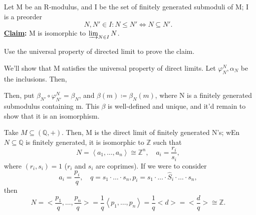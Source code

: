 \documentclass[../category_theory.tex]{subfiles}
\begin{document}
\begin{example}
	Let M be an R-modulus, and I be the set of finitely generated submoduli of M; I is a preorder
	\[
		N, N'\in I: N\leq N'\Longleftrightarrow N\subseteq N'.
	\]
	\textbf{\underline{Claim}:} M is isomorphic to \(\varinjlim_{N\in I}N\).
	\begin{exr}
		Use the universal property of directed limit to prove the claim.
	\end{exr}
	We'll show that M satisfies the universal property of direct limits. Let \(\varphi_{N}^{N}, \alpha_{N}\) be the inclusions. Then,
	\begin{center}
	\end{center}
	Then, put \(\beta_{N'}\circ \varphi_{N'}^{N}=\beta_{N}\), and \(\beta(m)\coloneqq \beta_{N}(m)\), where N is a finitely generated submodulus containing m. This \(\beta \) is well-defined and unique, and  it'd remain to show that it is an isomorphism.
\end{example}
\begin{example}
	Take \(M\subseteq (\mathbb{Q}, +)\). Then, M is the direct limit of finitely generated N's; wEn \(N\subseteq \mathbb{Q}\) is finitely generated, it is isomorphic to \(\mathbb{Z}\) such that
	\[
		N=\left< a_{1}, \dotsc , a_{n} \right>\cong \mathbb{Z}^{n},\quad a_{i}=\frac{r_{i}}{s_{i}},
	\]
	where \((r_{i}, s_{i})=1\) (\(r_{i}\) and \(s_{i}\) are coprimes). If we were to consider
	\[
		a_{i}=\frac{p_{i}}{q}, \quad q=s_{1}\cdot \dotsc \cdot s_{n}, p_{i}= s_{1}\cdot \dotsc \cdot \hat{S}_{i}\cdot \dotsc \cdot s_{n},
	\]
	then
	\[
		N=\biggl<\frac{p_{1}}{q},\dotsc , \frac{p_{n}}{q}\biggr> = \frac{1}{q}\left< p_{1}, \dotsc , p_{n} \right>=\frac{1}{q}<d> = \biggl<\frac{d}{q}\biggr>\cong \mathbb{Z}.
	\]
\end{example}
\end{document}
